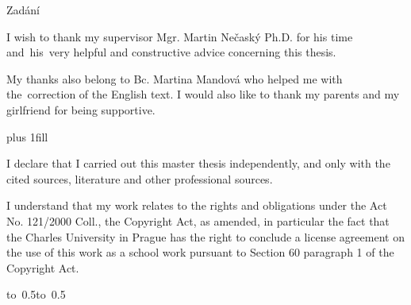 \documentclass[12pt,a4paper]{report}
\let\openright=\clearpage
\begin{document}
\newpage

Zadání

\newpage



\openright

\noindent
I wish to thank my supervisor Mgr. Martin Nečaský Ph.D. for his time and~his~very
helpful and constructive advice concerning this thesis.

My thanks also belong to Bc. Martina Mandová who helped me
with the~correction of the English text. I would also like to thank
my parents and my girlfriend for being supportive.

\newpage


\vglue 0pt plus 1fill

\noindent
I declare that I carried out this master thesis independently, and only with the cited
sources, literature and other professional sources.

\medskip\noindent
I understand that my work relates to the rights and obligations under the Act No.
121/2000 Coll., the Copyright Act, as amended, in particular the fact that the Charles
University in Prague has the right to conclude a license agreement on the use of this
work as a school work pursuant to Section 60 paragraph 1 of the Copyright Act.

\vspace{10mm}

\hbox{\hbox to 0.5\hbox to 0.5}

\vspace{20mm}
\newpage

\end{document}
